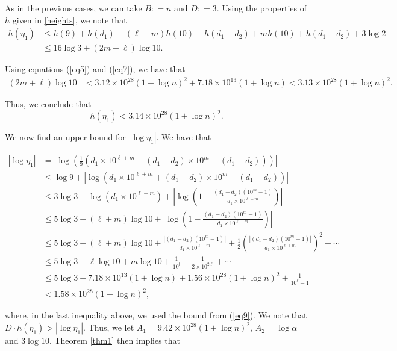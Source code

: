 \documentclass[10pt,a4paper]{article}
\begin{document}
\noindent As in the previous cases, we can take $B: = n$ and $D: = 3$. Using the properties of $ h $ given in \eqref{heights},  we note that
\begin{align*}
h(\eta_1) & \leq h(9) + h(d_1) + (\ell+m)h(10) + h(d_1 - d_2) + m h(10) + h(d_1 - d_2) + 3 \log 2\\
& \leq 16\log 3 + (2m+\ell) \log 10.
\end{align*}

\noindent Using equations (\ref{eq5}) and (\ref{eq7}), we have that
\begin{align}\label{eq9}
(2m + \ell)\log 10 & < 3.12\times 10^{28} (1 + \log n)^2 + 7.18 \times 10^{13}(1 + \log n) < 3.13 \times 10^{28}(1 + \log n)^2.
\end{align}

\noindent Thus, we conclude that
\begin{equation*}
h(\eta_1) < 3.14 \times 10^{28}(1 + \log n)^2.
\end{equation*}

\noindent We now find an upper bound for $|\log \eta_1|$. We have that

\begin{align*}
|\log \eta_1| & = \left| \log \left(  \frac{1}{9} \left(d_1 \times 10^{\ell+m} + (d_1-d_2)\times 10^m - (d_1-d_2) \right)\right) \right| \\
& \le \log 9  + \left|\log \left(d_1 \times 10^{\ell+m} + (d_1-d_2)\times 10^m - (d_1-d_2)\right)\right|\\
& \leq 3 \log 3 + \log (d_1 \times 10^{\ell + m}) + \left| \log \left(  1 - \frac{(d_1 - d_2)(10^m - 1)}{d_1 \times 10^{\ell+m}}  \right)  \right|\\
& \le 5 \log 3 + (\ell+m) \log 10 + \left| \log \left(  1 - \frac{(d_1 - d_2)(10^m - 1)}{d_1 \times 10^{\ell+m}}  \right)  \right|\\
& \le 5 \log 3 + (\ell+m) \log 10 + \frac{|(d_1 - d_2)(10^m - 1)|}{d_1 \times 10^{\ell + m}} + \frac{1}{2} \left( \frac{|(d_1 - d_2)(10^m - 1)|}{d_1 \times 10^{\ell + m}} \right)^2 + \cdots \\
& \le 5 \log 3 + \ell\log 10 +m\log 10 + \frac{1}{10^l} + \frac{1}{2 \times 10^{2\ell}} + \cdots\\
& \le 5 \log 3 + 7.18\times 10^{13}(1+\log n)+ 1.56\times 10^{28}(1+\log n)^2 +\frac{1}{10^\ell - 1}\\
& < 1.58 \times 10^{28}(1 + \log n)^2,
\end{align*}

\noindent where, in the last inequality above, we used the bound from (\ref{eq9}). We note that $D \cdot h(\eta_1) > |\log \eta_1|$. Thus, we let $A_1 = 9.42 \times 10^{28}(1 + \log n)^2$, $A_2 = \log \alpha$ and $3 \log 10$. Theorem \ref{thm1} then implies that
\end{document}
